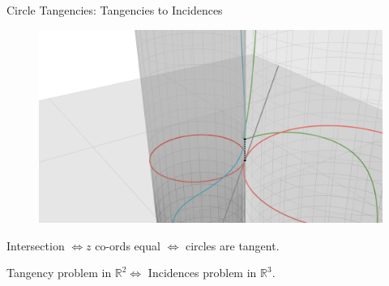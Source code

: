 \documentclass{beamer}
\newcommand{\RR}{\mathbb R}
\newcommand{\nfr}[1]{\begin{frame} #1
\end{frame}}
\begin{document}
\nfr{{Circle Tangencies: Tangencies to Incidences}

\begin{figure}[h]
    \centering
    \includegraphics[width=0.8
    \textwidth, trim={5cm 0 4cm 2cm}, clip=true]{images/Diagram4c.png}
\end{figure}

Intersection  $\iff z$ co-ords equal $\iff$  circles are tangent.

Tangency problem in $\RR^2 \iff $ Incidences problem in $\RR^3$.
}
\end{document}
